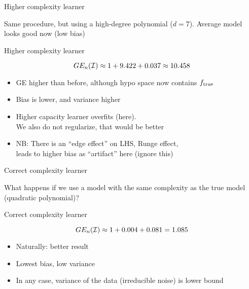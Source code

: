\documentclass[11pt,compress,t,notes=noshow, xcolor=table]{beamer}
\begin{document}
\begin{framei}[sep=M]{Higher complexity learner}

\item Same procedure, but using a high-degree polynomial ($d=7$). Average model looks good now (low bias)

\hfill


\end{framei} 

\begin{frame}{Higher complexity learner}

\splitVThree
{}
{}
{}


$$GE_n(\mathcal{I}) \approx 1 + 9.422 + 0.037 \approx 10.458 $$

\vfill

\begin{itemize}
\item GE higher than before, although hypo space now contains $f_{\text{true}}$
\item Bias is lower, and variance higher 
\item Higher capacity learner overfits (here).\\
We also do not regularize, that would be better

\item NB: There is an ``edge effect'' on LHS, Runge effect,\\
leads to higher bias as ``artifact'' here (ignore this)
\end{itemize}

\end{frame}

\begin{framei}[sep=M]{Correct complexity learner}

\item What happens if we use a model with the same complexity as the true model (quadratic polynomial)? 

\hfill


\end{framei}

\begin{frame}{Correct complexity learner}

\splitVThree
{}
{}
{}

\vfill

$$GE_n(\mathcal{I}) \approx 1 + 0.004 + 0.081 = 1.085 $$

\begin{itemize}
\item Naturally: better result
\item Lowest bias, low variance
\item In any case, variance of the data (irreducible noise) is lower bound
\end{itemize}

\end{frame}
\end{document}
